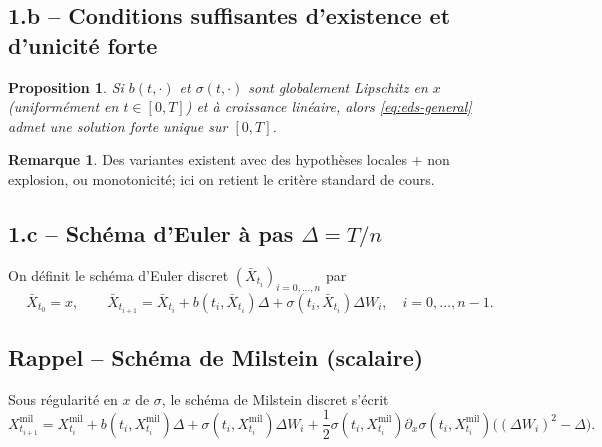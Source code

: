 \documentclass[11pt,a4paper]{article}
\newcommand{\1}{\mathbbm{1}}
\theoremstyle{plain}
\newtheorem{proposition}{Proposition}
\theoremstyle{definition}
\newtheorem{remark}{Remarque}
\begin{document}
\subsection{1.b -- Conditions suffisantes d'existence et d'unicité forte}
\begin{proposition}
Si $b(t,\cdot)$ et $\sigma(t,\cdot)$ sont globalement Lipschitz en $x$ (uniformément en $t\in[0,T]$) et à croissance linéaire, alors \eqref{eq:eds-general} admet une \emph{solution forte unique} sur $[0,T]$.
\end{proposition}
\begin{remark}
Des variantes existent avec des hypothèses locales + non explosion, ou monotonicité; ici on retient le critère standard de cours.
\end{remark}

\subsection{1.c -- Schéma d'Euler à pas $\Delta=T/n$}
On définit le schéma d'Euler discret $(\bar X_{t_i})_{i=0,\dots,n}$ par
\[
\bar X_{t_0}=x,\qquad
\bar X_{t_{i+1}}=\bar X_{t_i}+b(t_i,\bar X_{t_i})\Delta+\sigma(t_i,\bar X_{t_i})\Delta W_i,\quad i=0,\dots,n-1.
\]

\subsection{Rappel -- Schéma de Milstein (scalaire)}
Sous régularité en $x$ de $\sigma$, le schéma de Milstein discret s'écrit
\begin{equation}\label{eq:milstein}
X^{\mathrm{mil}}_{t_{i+1}}
=X^{\mathrm{mil}}_{t_i}+b(t_i,X^{\mathrm{mil}}_{t_i})\Delta+\sigma(t_i,X^{\mathrm{mil}}_{t_i})\Delta W_i
+\frac12\sigma(t_i,X^{\mathrm{mil}}_{t_i})\partial_x\sigma(t_i,X^{\mathrm{mil}}_{t_i})\big((\Delta W_i)^2-\Delta\big).
\end{equation}
\end{document}
